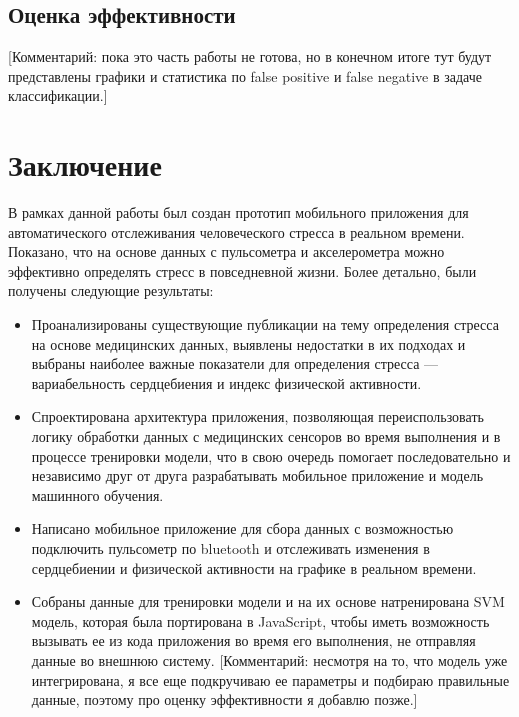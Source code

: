 \documentclass[14pt]{matmex-diploma-custom}
\begin{document}
\subsection{Оценка эффективности}
[Комментарий: пока это часть работы не готова, но в конечном итоге тут будут
представлены графики и статистика по false positive и false negative в задаче
классификации.]

\section*{Заключение}
В рамках данной работы был создан прототип мобильного приложения для
автоматического отслеживания человеческого стресса в реальном времени. Показано,
что на основе данных с пульсометра и акселерометра можно эффективно определять
стресс в повседневной жизни. Более детально, были получены следующие результаты:

\begin{itemize}
\item Проанализированы существующие публикации на тему определения стресса на
  основе медицинских данных, выявлены недостатки в их подходах и выбраны
  наиболее важные показатели для определения стресса — вариабельность
  сердцебиения и индекс физической активности.
\item Спроектирована архитектура приложения, позволяющая переиспользовать логику
  обработки данных с медицинских сенсоров во время выполнения и в процессе
  тренировки модели, что в свою очередь помогает последовательно и независимо
  друг от друга разрабатывать мобильное приложение и модель машинного обучения.
\item Написано мобильное приложение для сбора данных с возможностью подключить
  пульсометр по bluetooth и отслеживать изменения в сердцебиении и физической
  активности на графике в реальном времени.
\item Собраны данные для тренировки модели и на их основе натренирована SVM
  модель, которая была портирована в JavaScript, чтобы иметь возможность
  вызывать ее из кода приложения во время его выполнения, не отправляя данные во
  внешнюю систему. [Комментарий: несмотря на то, что модель уже интегрирована, я
  все еще подкручиваю ее параметры и подбираю правильные данные, поэтому про
  оценку эффективности я добавлю позже.]
\end{itemize}

\setmonofont[Mapping=tex-text]{CMU Typewriter Text}
 
\end{document}
